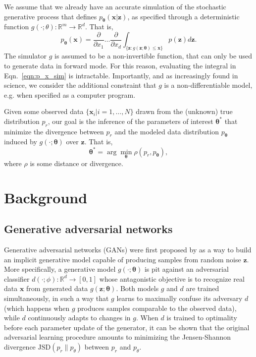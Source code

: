 \documentclass[twocolumn,superscriptaddress,aps]{revtex4-1}
\theoremstyle{plain}
\begin{document}
We assume that we already have an accurate simulation of the stochastic generative process
that defines $p_\mathbf{\theta}(\mathbf{x}|\mathbf{z})$, as specified through a deterministic function $g(\cdot;
\theta) : \mathbb{R}^m \to \mathbb{R}^d$. That is,
\begin{equation}\label{eqn:p_x_sim}
    p_\mathbf{\theta}(\mathbf{x}) = \frac{\partial}{\partial x_1} \dots \frac{\partial}{\partial x_d} \int_{\{\mathbf{z}:g(\mathbf{z};\mathbf{\theta}) \leq \mathbf{x}\}} p(\mathbf{z}) d\mathbf{z}.
\end{equation}
The simulator $g$ is assumed to be a non-invertible function, that can
only be used to generate data in forward mode.
For this reason, evaluating the integral in Eqn.~\ref{eqn:p_x_sim} is intractable.
Importantly, and as increasingly found in science, we consider the additional constraint that $g$ is a non-differentiable
model, e.g. when specified as a computer program.

Given some observed data $\{ \mathbf{x}_i | i=1, \dots, N \}$ drawn from the (unknown) true distribution $p_r$, our goal is the inference
of the parameters of interest $\mathbf{\theta}^*$ that minimize the divergence
between $p_r$ and the modeled
data distribution $p_\mathbf{\theta}$ induced by $g(\cdot; \mathbf{\theta})$ over $\mathbf{z}$. That is,
\begin{equation}
    \mathbf{\theta}^* = \arg \min_\mathbf{\theta} \rho(p_r, p_\mathbf{\theta}),
\end{equation}
where $\rho$ is some distance or divergence.



\section{Background}

\subsection{Generative adversarial networks}

Generative adversarial networks (GANs) were first proposed by
\cite{goodfellow2014generative} as a way to build an implicit generative model
capable of producing samples from random noise $\mathbf{z}$. More specifically,
a generative model $g(\cdot; \mathbf{\theta})$ is pit against an adversarial
classifier $d(\cdot; \phi):\mathbb{R}^d \to [0,1]$ whose antagonistic objective is to recognize real data $\mathbf{x}$
from generated data $g(\mathbf{z}; \mathbf{\theta})$. Both models $g$ and $d$
are trained simultaneously, in such a way that $g$ learns to maximally confuse
its adversary $d$ (which happens when $g$ produces samples comparable to the
observed data), while $d$ continuously adapts to changes in $g$. When $d$ is
trained to optimality before each parameter update of the generator, it can
be shown that the original adversarial learning procedure amounts to minimizing
the Jensen-Shannon divergence $\text{JSD}(p_r \parallel p_\theta)$ between $p_r$ and $p_\theta$.
\end{document}
